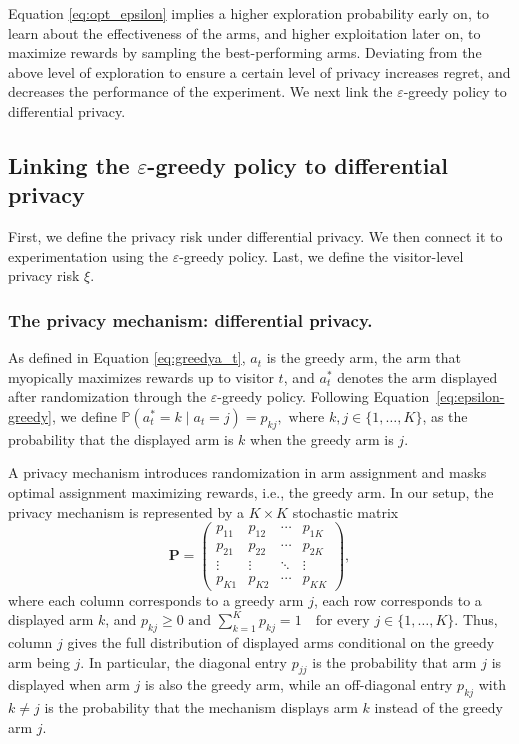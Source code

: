 \documentclass[mksc,nonblindrev]{informs3}
\begin{document}
Equation \eqref{eq:opt_epsilon} implies a higher exploration probability early on, to learn about the effectiveness of the arms, and higher exploitation later on, to maximize rewards by sampling the best-performing arms. Deviating from the above level of exploration to ensure a certain level of privacy increases regret, and decreases the performance of the experiment. 
We next link the $\varepsilon$-greedy policy to differential privacy.

\subsection{Linking the $\varepsilon$-greedy policy to differential privacy}
First, we define the privacy risk under differential privacy. We then connect it to experimentation using the $\varepsilon$-greedy policy. Last, we define the visitor-level privacy risk $\xi$.

\subsubsection{The privacy mechanism: differential privacy.}
As defined in Equation \eqref{eq:greedya_t}, $a_t$ is the greedy arm, the arm that myopically maximizes rewards up to visitor $t$, and $a_t^*$ denotes the arm displayed after randomization through the $\varepsilon$-greedy policy. Following Equation~\eqref{eq:epsilon-greedy}, we define $\mathbb{P}\!\left(a_t^*=k \mid a_t=j\right)=p_{kj}, \text{ where } k,j\in\{1,\dots,K\}$, as the probability that the displayed arm is \(k\) when the greedy arm is \(j\).

A privacy mechanism introduces randomization in arm assignment and masks optimal assignment maximizing rewards, i.e., the greedy arm. In our setup, the privacy mechanism is represented by a \(K\times K\) stochastic matrix
\begin{equation}
\label{eq:matrix1}
\mathbf{P}
=
\begin{pmatrix}
p_{11} & p_{12} & \cdots & p_{1K}\\
p_{21} & p_{22} & \cdots & p_{2K}\\
\vdots & \vdots & \ddots & \vdots\\
p_{K1} & p_{K2} & \cdots & p_{KK}
\end{pmatrix},
\end{equation}
where each column corresponds to a greedy arm \(j\), each row corresponds to a displayed arm \(k\), and
$p_{kj}\ge 0 \text{ and }
\sum_{k=1}^K p_{kj}=1
\quad\text{for every } j\in\{1,\dots,K\}$.
Thus, column \(j\) gives the full distribution of displayed arms conditional on the greedy arm being \(j\). In particular, the diagonal entry \(p_{jj}\) is the probability that arm \(j\) is displayed when arm \(j\) is also the greedy arm, while an off-diagonal entry \(p_{kj}\) with \(k\neq j\) is the probability that the mechanism displays arm \(k\) instead of the greedy arm \(j\).
\end{document}
